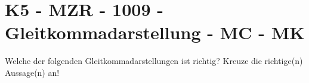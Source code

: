 \section{K5 - MZR - 1009 - Gleitkommadarstellung - MC - MK}

\begin{beispiel}[K5 - MZR]{1}
Welche der folgenden Gleitkommadarstellungen ist richtig? Kreuze die richtige(n) Aussage(n) an!

\end{beispiel}